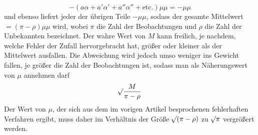 \[
-(a\alpha+a'\alpha'+a''\alpha''+\text{etc.})\mu\mu=-\mu\mu
\]
%
und ebenso liefert jeder der übrigen Teile \(-\mu\mu\), sodass der gesamte Mittelwert \(=(\pi-\rho)\mu\mu\) wird, wobei \(\pi\) die Zahl der Beobachtungen und \(\rho\) die Zahl der Unbekannten bezeichnet. Der wahre Wert von \(M\) kann freilich, je nachdem, welche Fehler der Zufall hervorgebracht hat, größer oder kleiner als der Mittelwert ausfallen. Die Abweichung wird jedoch umso weniger ins Gewicht fallen, je größer die Zahl der Beobachtungen ist, sodass man als Näherungswert von \(\mu\) annehmen darf
\[
\mathord{{}^{}\!\surd}\frac{M}{\pi-\rho}
\]
Der Wert von \(\mu\), der sich aus dem im vorigen Artikel besprochenen fehlerhaften Verfahren ergibt, muss daher im Verhältnis der Größe \(\mathord{{}^{}\!\surd}(\pi-\rho)\) zu \(\mathord{{}^{}\!\surd}\pi\) vergrößert werden.

\clearpage
